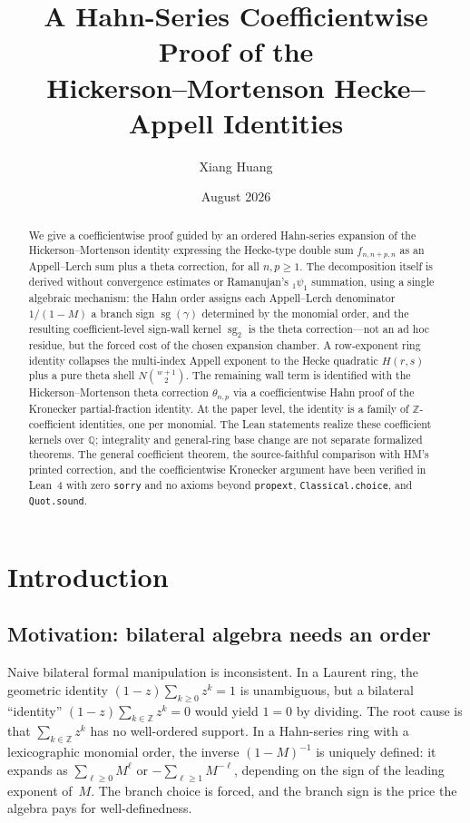 \documentclass[11pt]{article}
\title{A Hahn-Series Coefficientwise Proof of the\\
Hickerson--Mortenson Hecke--Appell Identities}
\author{Xiang Huang}
\date{August 2026}
\newcommand{\Z}{\mathbb{Z}}
\newcommand{\Q}{\mathbb{Q}}
\newcommand{\sg}{\operatorname{sg}}
\newcommand{\sgtwo}{\operatorname{sg}_2}
\begin{document}
\maketitle

\begin{abstract}
We give a coefficientwise proof guided by an ordered Hahn-series expansion
of the Hickerson--Mortenson identity expressing the Hecke-type
double sum $f_{n,n+p,n}$ as an Appell--Lerch sum plus a theta
correction, for all $n,p\ge 1$.  The decomposition itself is derived without convergence estimates or
Ramanujan's ${}_1\psi_1$ summation, using a single algebraic
mechanism: the Hahn order assigns each Appell--Lerch denominator
$1/(1-M)$ a branch sign $\sg(\gamma)$ determined by
the monomial order, and the resulting coefficient-level sign-wall kernel $\sgtwo$
is the theta correction---not an ad hoc residue, but the forced
cost of the chosen expansion chamber.  A row-exponent ring
identity collapses the multi-index Appell exponent to the Hecke
quadratic $H(r,s)$ plus a pure theta shell $N\binom{w+1}{2}$.
The remaining wall term is identified with the
Hickerson--Mortenson theta correction $\theta_{n,p}$ via a
coefficientwise Hahn proof of the Kronecker partial-fraction identity.
At the paper level, the identity is a family of $\Z$-coefficient
identities, one per monomial.  The Lean statements realize these
coefficient kernels over $\Q$; integrality and general-ring base change are
not separate formalized theorems.  The general coefficient theorem, the
source-faithful comparison with HM's printed correction, and the
coefficientwise Kronecker argument have been verified in Lean~4 with zero
\texttt{sorry}
and no axioms beyond \texttt{propext},
\texttt{Classical.choice}, and \texttt{Quot.sound}.
\end{abstract}

\section{Introduction}

\subsection*{Motivation: bilateral algebra needs an order}

Naive bilateral formal manipulation is inconsistent.
In a Laurent ring, the geometric identity
$(1-z)\sum_{k\ge 0}z^k=1$ is unambiguous, but a bilateral
``identity'' $(1-z)\sum_{k\in\Z}z^k=0$ would yield $1=0$ by
dividing.  The root cause is that $\sum_{k\in\Z}z^k$ has no
well-ordered support.  In a Hahn-series ring with a
lexicographic monomial order, the inverse $(1-M)^{-1}$ is
uniquely defined: it expands as $\sum_{\ell\ge 0}M^\ell$
or $-\sum_{\ell\ge 1}M^{-\ell}$, depending on the sign of the
leading exponent of~$M$.  The branch choice is forced, and
the branch sign is the price the algebra pays for
well-definedness.
\end{document}
